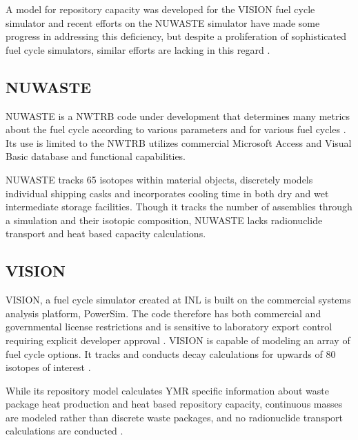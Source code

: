 A model for repository capacity was developed for the \gls{VISION} fuel cycle
simulator and recent efforts on the \gls{NUWASTE} simulator have made
some progress in addressing this deficiency, but despite a proliferation of
sophisticated fuel cycle simulators, similar efforts are lacking in this
regard \cite{yacout_vision_2006, radel_repository_2007, 
abkowitz_nuclear_2010}. 

\subsection{NUWASTE} 

\gls{NUWASTE} is a \acrlong{NWTRB} code under development 
that determines many metrics about the fuel cycle according to various
parameters and for various fuel cycles \cite{abkowitz_nuclear_2010}. Its use is 
limited to the \gls{NWTRB}  utilizes
commercial Microsoft Access and Visual Basic database and functional capabilities.  


\gls{NUWASTE} tracks 65 isotopes within 
material objects, discretely models individual shipping casks and incorporates 
cooling time in both dry and wet intermediate storage facilities. Though it 
tracks the number of assemblies through a simulation and their 
isotopic composition, \gls{NUWASTE} lacks radionuclide transport and heat based 
capacity calculations. 

\subsection{VISION} 

\gls{VISION}, a fuel cycle simulator created at \gls{INL} is built on the 
commercial systems analysis platform, PowerSim. The code therefore has both 
commercial and governmental license restrictions and is sensitive to 
laboratory export control requiring explicit developer approval 
\cite{yacout_daness_2011,van_den_durpel_daness:_2006}. \gls{VISION} is 
capable of modeling an array of fuel cycle options. It tracks and conducts 
decay calculations for upwards of 80 isotopes of interest 
\cite{yacout_vision_2006, wilson_comparing_2011}.

While its repository model calculates \gls{YMR} specific information 
about waste package heat production and heat based repository capacity, 
continuous masses are modeled rather than discrete  waste packages, and no 
radionuclide transport calculations are conducted  
\cite{radel_repository_2007, boucher_international_2010}.

